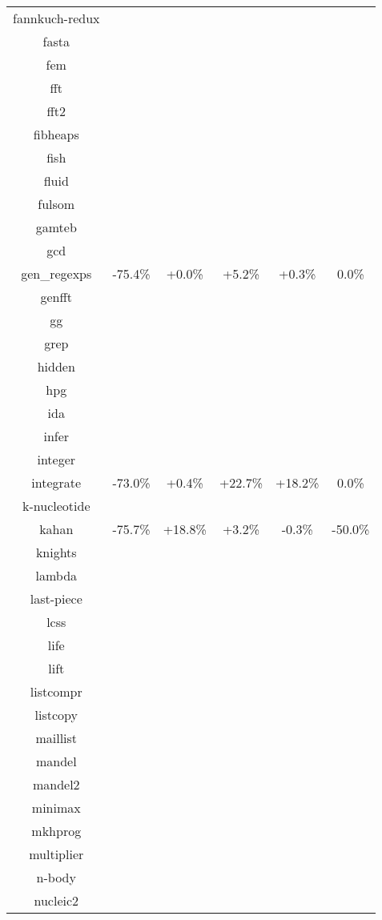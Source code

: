 \begin{tabular}{ c c c c c c }
fannkuch-redux &  &  &  &  & \\
fasta &  &  &  &  & \\
fem &  &  &  &  & \\
fft &  &  &  &  & \\
fft2 &  &  &  &  & \\
fibheaps &  &  &  &  & \\
fish &  &  &  &  & \\
fluid &  &  &  &  & \\
fulsom &  &  &  &  & \\
gamteb &  &  &  &  & \\
gcd &  &  &  &  & \\
gen\_regexps & -75.4\% & +0.0\% & +5.2\% & +0.3\% &  0.0\%\\
genfft &  &  &  &  & \\
gg &  &  &  &  & \\
grep &  &  &  &  & \\
hidden &  &  &  &  & \\
hpg &  &  &  &  & \\
ida &  &  &  &  & \\
infer &  &  &  &  & \\
integer &  &  &  &  & \\
integrate & -73.0\% & +0.4\% & +22.7\% & +18.2\% &  0.0\%\\
k-nucleotide &  &  &  &  & \\
kahan & -75.7\% & +18.8\% & +3.2\% & -0.3\% & -50.0\%\\
knights &  &  &  &  & \\
lambda &  &  &  &  & \\
last-piece &  &  &  &  & \\
lcss &  &  &  &  & \\
life &  &  &  &  & \\
lift &  &  &  &  & \\
listcompr &  &  &  &  & \\
listcopy &  &  &  &  & \\
maillist &  &  &  &  & \\
mandel &  &  &  &  & \\
mandel2 &  &  &  &  & \\
minimax &  &  &  &  & \\
mkhprog &  &  &  &  & \\
multiplier &  &  &  &  & \\
n-body &  &  &  &  & \\
nucleic2 &  &  &  &  & \\

\end{tabular}

